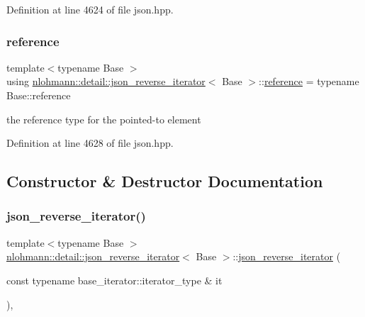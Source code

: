 Definition at line 4624 of file json.\+hpp.

\mbox{\label{classnlohmann_1_1detail_1_1json__reverse__iterator_a42f51a69bac7b2aebb613b2164e457f1}} 
\subsubsection{\texorpdfstring{reference}{reference}}
{\footnotesize\ttfamily template$<$typename Base $>$ \\
using \hyperlink{classnlohmann_1_1detail_1_1json__reverse__iterator}{nlohmann\+::detail\+::json\+\_\+reverse\+\_\+iterator}$<$ Base $>$\+::\hyperlink{classnlohmann_1_1detail_1_1json__reverse__iterator_a42f51a69bac7b2aebb613b2164e457f1}{reference} =  typename Base\+::reference}



the reference type for the pointed-\/to element 



Definition at line 4628 of file json.\+hpp.



\subsection{Constructor \& Destructor Documentation}
\mbox{\label{classnlohmann_1_1detail_1_1json__reverse__iterator_a0246de16ece16293f2917dfa5d96e278}} 
\subsubsection{\texorpdfstring{json\+\_\+reverse\+\_\+iterator()}{json\_reverse\_iterator()}\hspace{0.1cm}{\footnotesize\ttfamily [1/2]}}
{\footnotesize\ttfamily template$<$typename Base $>$ \\
\hyperlink{classnlohmann_1_1detail_1_1json__reverse__iterator}{nlohmann\+::detail\+::json\+\_\+reverse\+\_\+iterator}$<$ Base $>$\+::\hyperlink{classnlohmann_1_1detail_1_1json__reverse__iterator}{json\+\_\+reverse\+\_\+iterator} (\begin{DoxyParamCaption}\item[{const typename base\+\_\+iterator\+::iterator\+\_\+type \&}]{it }\end{DoxyParamCaption})\hspace{0.3cm}{\ttfamily [inline]}, {\ttfamily [noexcept]}}



